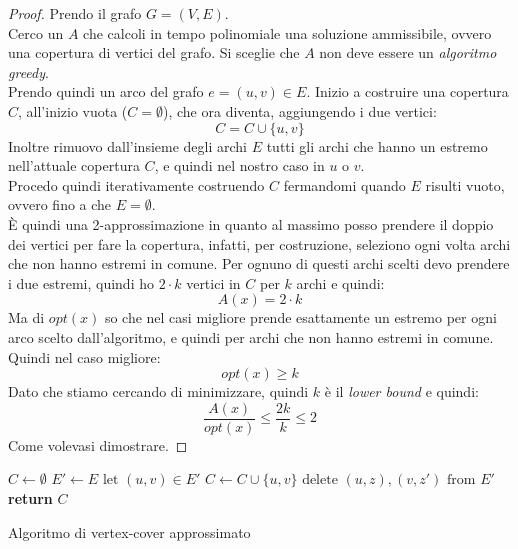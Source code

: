 														\begin{proof}
															Prendo il grafo $G=(V,E)$.\\
															Cerco un $A$ che calcoli in tempo polinomiale una soluzione ammissibile,
															ovvero una copertura di vertici del grafo. Si sceglie che $A$ non deve essere
															un \textit{algoritmo greedy}.\\
															Prendo quindi un arco del grafo $e=(u,v)\in E$. Inizio a costruire una
															copertura $C$, all'inizio vuota ($C=\emptyset$), che ora diventa, aggiungendo
															i due vertici:
															\[C=C\cup\{u,v\}\]
															Inoltre rimuovo dall'insieme degli archi $E$ tutti gli archi che hanno un
															estremo nell'attuale copertura $C$, e quindi nel nostro caso in $u$ o $v$.\\
															Procedo quindi iterativamente costruendo $C$ fermandomi quando $E$ risulti
															vuoto, ovvero fino a che $E=\emptyset$.\\
															È quindi una 2-approssimazione in quanto al massimo posso prendere il doppio
															dei vertici per fare la copertura, infatti, per costruzione, seleziono ogni
															volta archi che non hanno estremi in comune. Per ognuno di questi archi scelti
															devo prendere i due estremi, quindi ho $2\cdot k$ vertici in $C$ per $k$ archi
															e quindi:
															\[A(x)=2\cdot k\]
															Ma di $opt(x)$ so che nel casi migliore prende esattamente un estremo per ogni
															arco scelto dall'algoritmo, e quindi per archi che non hanno estremi in
															comune. Quindi nel caso migliore:
															\[opt(x)\geq k\]
															Dato che stiamo cercando di minimizzare, quindi $k$ è il \textit{lower bound} e
															quindi:
															\[\frac{A(x)}{opt(x)}\leq\frac{2k}{k}\leq 2\]
															Come volevasi dimostrare.
														\end{proof}
														\begin{algorithm}
															\begin{algorithmic}
																\State $C\gets\emptyset$
																\State $E'\gets E$
																\State $\mbox{let }(u,v)\in E'$
																\State $C\gets C\cup \{u,v\}$
																\State $\mbox{delete } (u,z),(v,z') \mbox{ from } E'$
																\EndFor
																\EndWhile
																\State \textbf{return} $C$
																\EndFunction
															\end{algorithmic}
															\caption{Algoritmo di vertex-cover approssimato}
														\end{algorithm}
